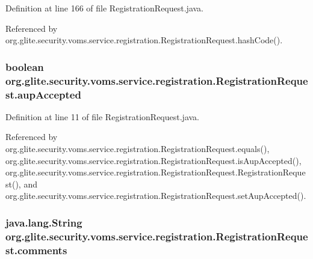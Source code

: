 Definition at line 166 of file RegistrationRequest.java.



Referenced by org.glite.security.voms.service.registration.RegistrationRequest.hashCode().

\hypertarget{classorg_1_1glite_1_1security_1_1voms_1_1service_1_1registration_1_1RegistrationRequest_aa17781ebf05d8a324058b9c77b6f13db}{
\subsubsection[{aupAccepted}]{\setlength{\rightskip}{0pt plus 5cm}boolean {\bf org.glite.security.voms.service.registration.RegistrationRequest.aupAccepted}}}
\label{classorg_1_1glite_1_1security_1_1voms_1_1service_1_1registration_1_1RegistrationRequest_aa17781ebf05d8a324058b9c77b6f13db}


Definition at line 11 of file RegistrationRequest.java.



Referenced by org.glite.security.voms.service.registration.RegistrationRequest.equals(), org.glite.security.voms.service.registration.RegistrationRequest.isAupAccepted(), org.glite.security.voms.service.registration.RegistrationRequest.RegistrationRequest(), and org.glite.security.voms.service.registration.RegistrationRequest.setAupAccepted().

\hypertarget{classorg_1_1glite_1_1security_1_1voms_1_1service_1_1registration_1_1RegistrationRequest_adcb05eaf70616f61ffb34f4813c53ed1}{
\subsubsection[{comments}]{\setlength{\rightskip}{0pt plus 5cm}java.lang.String {\bf org.glite.security.voms.service.registration.RegistrationRequest.comments}}}
\label{classorg_1_1glite_1_1security_1_1voms_1_1service_1_1registration_1_1RegistrationRequest_adcb05eaf70616f61ffb34f4813c53ed1}



